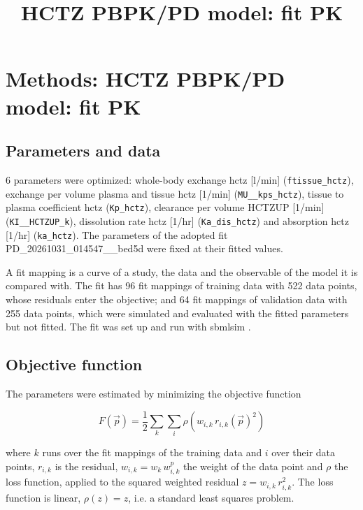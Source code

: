 \documentclass{article}
\title{HCTZ PBPK/PD model: fit PK}
\date{}
\begin{document}
\maketitle

\section{Methods: HCTZ PBPK/PD model: fit PK}

\subsection{Parameters and data}

6 parameters were optimized: whole-body exchange hctz [l/min] (\texttt{ftissue\_hctz}), exchange per volume plasma and tissue hctz [1/min] (\texttt{MU\_\_kps\_hctz}), tissue to plasma coefficient hctz (\texttt{Kp\_hctz}), clearance per volume HCTZUP [1/min] (\texttt{KI\_\_HCTZUP\_k}), dissolution rate hctz [1/hr] (\texttt{Ka\_dis\_hctz}) and absorption hctz [1/hr] (\texttt{ka\_hctz}). The parameters of the adopted fit PD\_20261031\_014547\_\_bed5d were fixed at their fitted values.

A fit mapping is a curve of a study, the data and the observable of the model it is compared with. The fit has 96 fit mappings of training data with 522 data points, whose residuals enter the objective; and 64 fit mappings of validation data with 255 data points, which were simulated and evaluated with the fitted parameters but not fitted. The fit was set up and run with sbmlsim \cite{Koenig2026_sbmlsim}.

\subsection{Objective function}

The parameters were estimated by minimizing the objective function

\begin{equation}
F(\vec{p}) = \frac{1}{2} \sum_{k} \sum_{i} \rho\left(w_{i,k}\, r_{i,k}(\vec{p})^2\right)
\end{equation}

where $k$ runs over the fit mappings of the training data and $i$ over their data points, $r_{i,k}$ is the residual, $w_{i,k} = w_k\, w^{p}_{i,k}$ the weight of the data point and $\rho$ the loss function, applied to the squared weighted residual $z = w_{i,k}\, r_{i,k}^2$. The loss function is linear, $\rho(z) = z$, i.e. a standard least squares problem.
\end{document}
